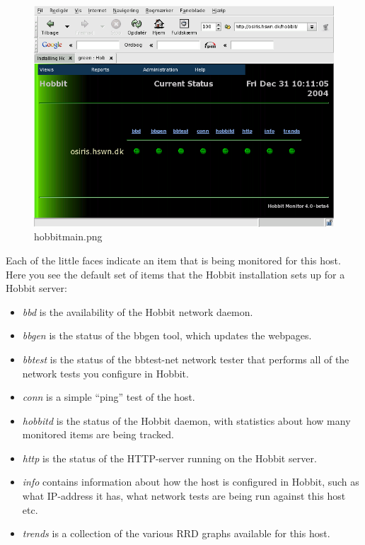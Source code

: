 \begin{figure} 
\centering \caption{hobbitmain.png}
\label{hobbitmain.png}
\includegraphics[scale=0.6]{./hobbitmain.png} 
\end{figure}


 Each of the little faces indicate an item that is being monitored for
 this host. Here you see the default set of items that the Hobbit
 installation sets up for a Hobbit server:

\begin{itemize}
\item \emph{bbd}
 is the availability of the Hobbit network daemon.
\item \emph{bbgen}
 is the status of the bbgen tool, which updates the webpages.
\item \emph{bbtest}
 is the status of the bbtest-net network tester that performs all of
 the network tests you configure in Hobbit.

\item \emph{conn}
 is a simple ``ping'' test of the host.
\item \emph{hobbitd}
 is the status of the Hobbit daemon, with statistics about how many
 monitored items are being tracked.

\item \emph{http}
 is the status of the HTTP-server running on the Hobbit server.
\item \emph{info}
 contains information about how the host is configured in Hobbit, such
 as what IP-address it has, what network tests are being run against
 this host etc.

\item \emph{trends}
 is a collection of the various RRD graphs available for this host.

\end{itemize}


